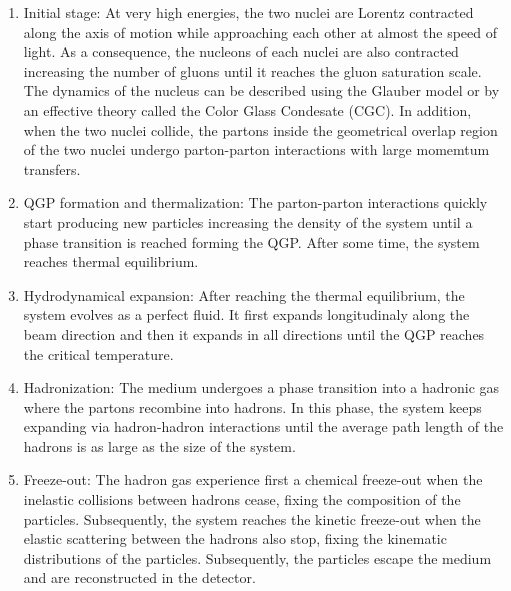 \begin{enumerate}

\item Initial stage: At very high energies, the two nuclei are Lorentz contracted along the axis of motion while approaching each other at almost the speed of light. As a consequence, the nucleons of each nuclei are also contracted increasing the number of gluons until it reaches the gluon saturation scale. The dynamics of the nucleus can be described using the Glauber model or by an effective theory called the Color Glass Condesate (CGC). In addition, when the two nuclei collide, the partons inside the geometrical overlap region of the two nuclei undergo parton-parton interactions with large momemtum transfers. \\

\item QGP formation and thermalization: The parton-parton interactions quickly start producing new particles increasing the density of the system until a phase transition is reached forming the QGP. After some time, the system reaches thermal equilibrium. \\

\item Hydrodynamical expansion: After reaching the thermal equilibrium, the system evolves as a perfect fluid. It first expands longitudinaly along the beam direction and then it expands in all directions until the QGP reaches the critical temperature. \\

\item Hadronization: The medium undergoes a phase transition into a hadronic gas where the partons recombine into hadrons. In this phase, the system keeps expanding via hadron-hadron interactions until the average path length of the hadrons is as large as the size of the system. \\

\item Freeze-out: The hadron gas experience first a chemical freeze-out when the inelastic collisions between hadrons cease, fixing the composition of the particles. Subsequently, the system reaches the kinetic freeze-out when the elastic scattering between the hadrons also stop, fixing the kinematic distributions of the particles. Subsequently, the particles escape the medium and are reconstructed in  the detector.

\end{enumerate}

